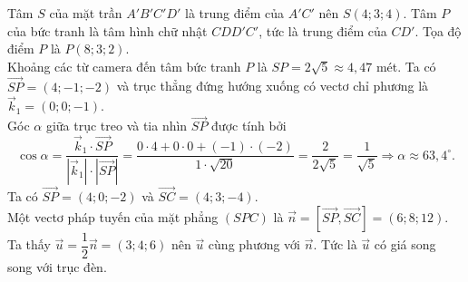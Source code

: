 \begin{ex}
{\begin{itemchoice}
			\itemch Tâm $S$ của mặt trần $A'B'C'D'$ là trung điểm của $A'C'$ nên $S(4;3;4)$.
			\itemch Tâm $P$ của bức tranh là tâm hình chữ nhật $CDD'C'$, tức là trung điểm của $CD'$.
			Tọa độ điểm $P$ là $P(8;3;2)$. \\
			Khoảng các từ camera đến tâm bức tranh $P$ là
			$SP=2\sqrt{5}\approx 4{,}47$ mét.
			\itemch Ta có $\overrightarrow{SP}=(4;-1;-2)$ và trục thẳng đứng hướng xuống có vectơ chỉ phương là $\overrightarrow{k}_1 = (0;0;-1)$. \\
			Góc $\alpha$ giữa trục treo và tia nhìn $\overrightarrow{SP}$ được tính bởi
			$$\cos \alpha=\dfrac{\overrightarrow{k}_1\cdot\overrightarrow{SP}}{\left|\overrightarrow{k}_1\right|\cdot\left|\overrightarrow{SP}\right|}=\dfrac{0\cdot4+0\cdot 0+(-1)\cdot (-2)}{1\cdot\sqrt{20}}=\dfrac{2}{2\sqrt{5}}=\dfrac{1}{\sqrt{5}}\Rightarrow\alpha\approx 63{,}4^\circ. $$
			\itemch
			Ta có $\overrightarrow{SP}=(4;0;-2)$ và $\overrightarrow{SC}=(4;3;-4)$. \\
			Một vectơ pháp tuyến của mặt phẳng $(SPC)$ là
			$\overrightarrow{n}=\left[\overrightarrow{SP},\overrightarrow{SC}\right]=(6;8;12)$. \\
			Ta thấy $\overrightarrow{u}=\dfrac{1}{2}\overrightarrow{n}=(3;4;6)$ nên  $\overrightarrow{u}$ cùng phương với $\overrightarrow{n}$. Tức là $\overrightarrow{u}$ có giá song song với trục đèn.
		\end{itemchoice}
	}
\end{ex}

